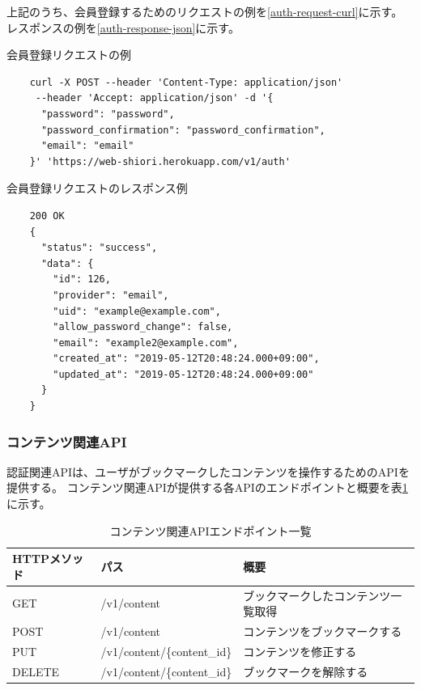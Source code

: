 上記のうち、会員登録するためのリクエストの例を\ref{auth-request-curl}に示す。
レスポンスの例を\ref{auth-response-json}に示す。

\begin{itembox}[l]{会員登録リクエストの例}
  \label{auth-request-curl}
  \begin{verbatim}
    curl -X POST --header 'Content-Type: application/json'
     --header 'Accept: application/json' -d '{
      "password": "password",
      "password_confirmation": "password_confirmation",
      "email": "email"
    }' 'https://web-shiori.herokuapp.com/v1/auth'
  \end{verbatim}
\end{itembox}

\begin{itembox}[l]{会員登録リクエストのレスポンス例}
  \label{auth-response-json}
  \begin{verbatim}
    200 OK
    {
      "status": "success",
      "data": {
        "id": 126,
        "provider": "email",
        "uid": "example@example.com",
        "allow_password_change": false,
        "email": "example2@example.com",
        "created_at": "2019-05-12T20:48:24.000+09:00",
        "updated_at": "2019-05-12T20:48:24.000+09:00"
      }
    }
  \end{verbatim}
\end{itembox}

\subsubsection{コンテンツ関連API}
認証関連APIは、ユーザがブックマークしたコンテンツを操作するためのAPIを提供する。
コンテンツ関連APIが提供する各APIのエンドポイントと概要を表\ref{tb:design-content-api}に示す。

\begin{table}[htbp]
  \label{tb:design-content-api}
  \caption{コンテンツ関連APIエンドポイント一覧}
  \begin{center}
    \begin{tabular}{|l|l|l|}
      \hline
      HTTPメソッド & パス & 概要 \\\hline\hline
      GET & /v1/content & ブックマークしたコンテンツ一覧取得 \\\hline
      POST & /v1/content & コンテンツをブックマークする \\\hline
      PUT & /v1/content/\{content\_id\} & コンテンツを修正する \\\hline
      DELETE & /v1/content/\{content\_id\} & ブックマークを解除する \\\hline
    \end{tabular}
  \end{center}
\end{table}

